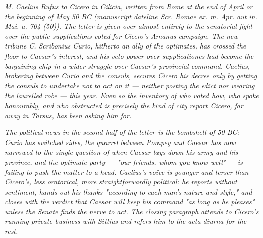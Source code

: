 
\textit{M. Caelius Rufus to Cicero in Cilicia, written from
Rome at the end of April or the beginning of May 50 BC
(manuscript dateline \textit{Scr. Romae ex. m. Apr. aut in.
Mai. a. 704 (50)}). The letter is given over almost entirely
to the senatorial fight over the public supplications voted
for Cicero's Amanus campaign. The new tribune C. Scribonius
Curio, hitherto an ally of the optimates, has crossed the
floor to Caesar's interest, and his veto-power over
supplicationes had become the bargaining chip in a wider
struggle over Caesar's provincial command. Caelius, brokering
between Curio and the consuls, secures Cicero his decree
only by getting the consuls to undertake not to act on it ---
neither posting the edict nor wearing the laurelled robe ---
this year. Even so the inventory of who voted how, who
spoke honourably, and who obstructed is precisely the kind
of city report Cicero, far away in Tarsus, has been asking
him for.}

\textit{The political news in the second half of the letter
is the bombshell of 50 BC: Curio has switched sides, the
quarrel between Pompey and Caesar has now narrowed to the
single question of when Caesar lays down his army and his
province, and the optimate party --- "our friends, whom you
know well" --- is failing to push the matter to a head.
Caelius's voice is younger and terser than Cicero's, less
oratorical, more straightforwardly political: he reports
without sentiment, hands out his thanks "according to each
man's nature and style," and closes with the verdict that
Caesar will keep his command "as long as he pleases" unless
the Senate finds the nerve to act. The closing paragraph
attends to Cicero's running private business with Sittius
and refers him to the \textit{acta diurna} for the rest.}
